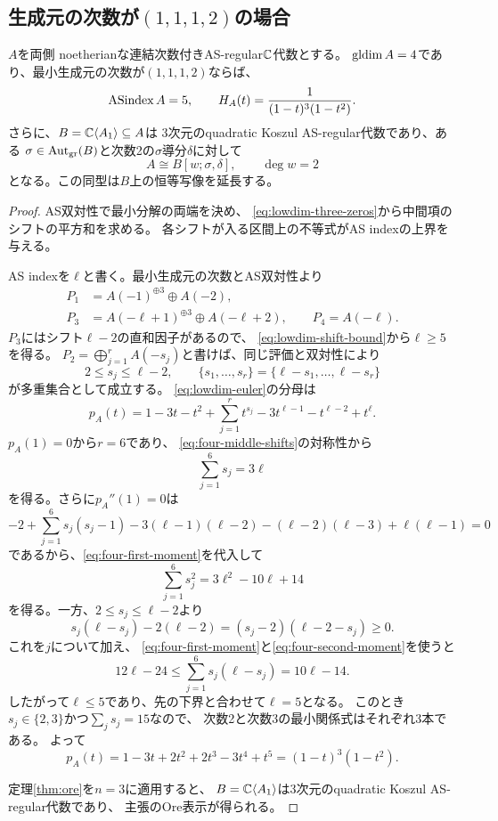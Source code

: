 \subsection{生成元の次数が\texorpdfstring{$(1,1,1,2)$}{(1,1,1,2)}の場合}

\begin{proposition}
\label{prop:index-four}
$A$を両側 noetherianな連結次数付きAS-regular$\mathbb C$代数とする。
$\operatorname{gldim} A=4$であり、最小生成元の次数が$(1,1,1,2)$ならば、
\[
  \operatorname{ASindex} A=5,
  \qquad
  H_A(t)=\frac{1}{(1-t)^3(1-t^2)}.
\]
さらに、$B=\mathbb C\langle A_1\rangle\subseteq A$は
3次元のquadratic Koszul AS-regular代数であり、ある
$\sigma\in\operatorname{Aut}_{\mathrm{gr}}(B)$と次数2の$\sigma$導分$\delta$に対して
\[
  A\cong B[w;\sigma,\delta],\qquad \deg w=2
\]
となる。この同型は$B$上の恒等写像を延長する。
\end{proposition}

\begin{proof}
AS双対性で最小分解の両端を決め、
\eqref{eq:lowdim-three-zeros}から中間項のシフトの平方和を求める。
各シフトが入る区間上の不等式がAS indexの上界を与える。

AS indexを$\ell$と書く。最小生成元の次数とAS双対性より
\[
\begin{split}
  P_1&=A(-1)^{\oplus3}\oplus A(-2),\\
  P_3&=A(-\ell+1)^{\oplus3}\oplus A(-\ell+2),
  \qquad P_4=A(-\ell).
\end{split}
\]
$P_3$にはシフト$\ell-2$の直和因子があるので、
\eqref{eq:lowdim-shift-bound}から$\ell\geq5$を得る。
$P_2=\bigoplus_{j=1}^{r}A(-s_j)$と書けば、同じ評価と双対性により
\begin{equation}
  2\leq s_j\leq\ell-2,
  \qquad
  \{s_1,\ldots,s_r\}=\{\ell-s_1,\ldots,\ell-s_r\}
  \label{eq:four-middle-shifts}
\end{equation}
が多重集合として成立する。
\eqref{eq:lowdim-euler}の分母は
\[
  p_A(t)=1-3t-t^2+\sum_{j=1}^{r}t^{s_j}
       -3t^{\ell-1}-t^{\ell-2}+t^\ell.
\]
$p_A(1)=0$から$r=6$であり、
\eqref{eq:four-middle-shifts}の対称性から
\begin{equation}
  \sum_{j=1}^{6}s_j=3\ell
  \label{eq:four-first-moment}
\end{equation}
を得る。さらに$p_A''(1)=0$は
\[
  -2+\sum_{j=1}^{6}s_j(s_j-1)
  -3(\ell-1)(\ell-2)-(\ell-2)(\ell-3)+\ell(\ell-1)=0
\]
であるから、\eqref{eq:four-first-moment}を代入して
\begin{equation}
  \sum_{j=1}^{6}s_j^2=3\ell^2-10\ell+14
  \label{eq:four-second-moment}
\end{equation}
を得る。一方、$2\leq s_j\leq\ell-2$より
\[
  s_j(\ell-s_j)-2(\ell-2)
   =(s_j-2)(\ell-2-s_j)\geq0.
\]
これを$j$について加え、
\eqref{eq:four-first-moment}と\eqref{eq:four-second-moment}を使うと
\[
  12\ell-24\leq
  \sum_{j=1}^{6}s_j(\ell-s_j)=10\ell-14.
\]
したがって$\ell\leq5$であり、先の下界と合わせて$\ell=5$となる。
このとき$s_j\in\{2,3\}$かつ$\sum_js_j=15$なので、
次数2と次数3の最小関係式はそれぞれ3本である。
よって
\[
  p_A(t)=1-3t+2t^2+2t^3-3t^4+t^5
        =(1-t)^3(1-t^2).
\]

定理\ref{thm:ore}を$n=3$に適用すると、
$B=\mathbb C\langle A_1\rangle$は3次元のquadratic Koszul AS-regular代数であり、
主張のOre表示が得られる。
\end{proof}

